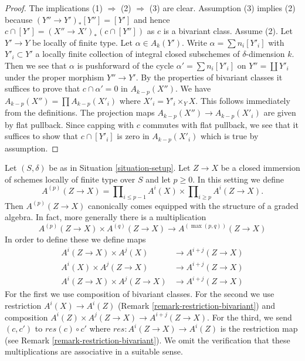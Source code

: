 \begin{proof}
The implications (1) $\Rightarrow$ (2) $\Rightarrow$ (3) are clear.
Assumption (3) implies (2) because $(Y'' \to Y')_*[Y''] = [Y']$
and hence $c \cap [Y'] = (X'' \to X')_*(c \cap [Y''])$ as $c$
is a bivariant class. Assume (2).
Let $Y' \to Y$ be locally of finite type. Let $\alpha \in A_k(Y')$.
Write $\alpha = \sum n_i [Y'_i]$ with $Y'_i \subset Y'$ a locally finite
collection of integral closed subschemes of $\delta$-dimension $k$.
Then we see that $\alpha$ is pushforward of the cycle
$\alpha' = \sum n_i[Y'_i]$ on $Y'' = \coprod Y'_i$ under the
proper morphism $Y'' \to Y'$. By the properties of bivariant
classes it suffices to prove that $c \cap \alpha' = 0$ in $A_{k - p}(X'')$.
We have $A_{k - p}(X'') = \prod A_{k - p}(X'_i)$ where
$X'_i = Y'_i \times_Y X$. This follows immediately
from the definitions. The projection maps
$A_{k - p}(X'') \to A_{k - p}(X'_i)$ are given by flat pullback.
Since capping with $c$ commutes with
flat pullback, we see that it suffices to show that $c \cap [Y'_i]$
is zero in $A_{k - p}(X'_i)$ which is true by assumption.
\end{proof}

\begin{remark}
\label{remark-ring-loc-classes}
Let $(S, \delta)$ be as in Situation \ref{situation-setup}.
Let $Z \to X$ be a closed immersion of schemes locally of
finite type over $S$ and let $p \geq 0$. In this setting we define
$$
A^{(p)}(Z \to X) =
\prod\nolimits_{i \leq p - 1} A^i(X) \times
\prod\nolimits_{i \geq p} A^i(Z \to X).
$$
Then $A^{(p)}(Z \to X)$ canonically comes equipped with the structure
of a graded algebra. In fact, more generally there is a multiplication
$$
A^{(p)}(Z \to X) \times A^{(q)}(Z \to X)
\longrightarrow A^{(\max(p, q))}(Z \to X)
$$
In order to define these we define maps
\begin{align*}
A^i(Z \to X) \times A^j(X) & \to A^{i + j}(Z \to X) \\
A^i(X) \times A^j(Z \to X) & \to A^{i + j}(Z \to X) \\
A^i(Z \to X) \times A^j(Z \to X) & \to A^{i + j}(Z \to X)
\end{align*}
For the first we use composition of bivariant classes.
For the second we use restriction
$A^i(X) \to A^i(Z)$ (Remark \ref{remark-restriction-bivariant}) and
composition $A^i(Z) \times A^j(Z \to X) \to A^{i + j}(Z \to X)$.
For the third, we send $(c, c')$ to $res(c) \circ c'$
where $res : A^i(Z \to X) \to A^i(Z)$ is the restriction map (see
Remark \ref{remark-restriction-bivariant}). We omit the
verification that these multiplications are associative in a suitable sense.
\end{remark}

